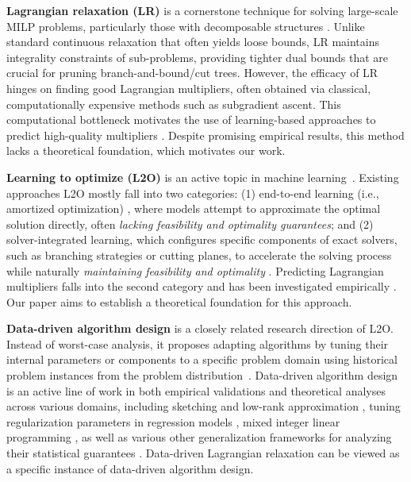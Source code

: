 \documentclass{article}
\theoremstyle{plain}
\theoremstyle{definition}
\theoremstyle{remark}
\begin{document}
\textbf{Lagrangian relaxation (LR)} is a cornerstone technique for solving large-scale MILP problems, particularly those with decomposable structures \citep{fisher1981lagrangian, lemarechal2001lagrangian}. Unlike standard continuous relaxation that often yields loose bounds, LR maintains integrality constraints of sub-problems, providing tighter dual bounds \citep{geoffrion2009lagrangean} that are crucial for pruning branch-and-bound/cut trees. However, the efficacy of LR hinges on finding good Lagrangian multipliers, often obtained via classical,  computationally expensive methods such as subgradient ascent. This computational bottleneck motivates the use of learning-based approaches to predict high-quality multipliers \citep{demelas2024predicting}. Despite promising empirical results, this method lacks a theoretical foundation, which motivates our work.    

\textbf{Learning to optimize (L2O)} is an active topic in machine learning~\citep{van2024ai4opt, chen2022learning}. Existing approaches L2O mostly fall into two categories: (1) end-to-end learning (i.e., amortized optimization) \citep{amos2023tutorial, kool2018attention, cappart2023combinatorial}, where models attempt to approximate the optimal solution directly, often \textit{lacking feasibility and optimality guarantees}; and (2) solver-integrated learning, which configures specific components of exact solvers, such as branching strategies or cutting planes, to accelerate the solving process while naturally \textit{maintaining feasibility and optimality} \citep{balcan2021sample, balcan2022structural, cheng2025generalization, nguyen2026provably}. Predicting Lagrangian multipliers falls into the second category and has been investigated empirically \citep{demelas2024predicting}. Our paper aims to establish a theoretical foundation for this approach. 

\textbf{Data-driven algorithm design} is a closely related research direction of L2O. Instead of worst-case analysis, it proposes adapting algorithms by tuning their internal parameters or components to a specific problem domain using historical problem instances from the problem distribution~\citep{gupta2020data, balcan2020data}. Data-driven algorithm design is an active line of work in both empirical validations and theoretical analyses across various domains, including sketching and low-rank approximation \citep{indyk2019learning, li2023learning}, tuning regularization parameters in regression models \citep{balcan2023new}, mixed integer linear programming \citep{balcan2022structural, balcan2018learning, cheng2025generalization}, as well as various other generalization frameworks for analyzing their statistical guarantees \citep{balcan2021much, bartlett2022generalization, balcan2025algorithm, balcan2025sample, le2026provably}. Data-driven Lagrangian relaxation can be viewed as a specific instance of data-driven algorithm design.
\end{document}
